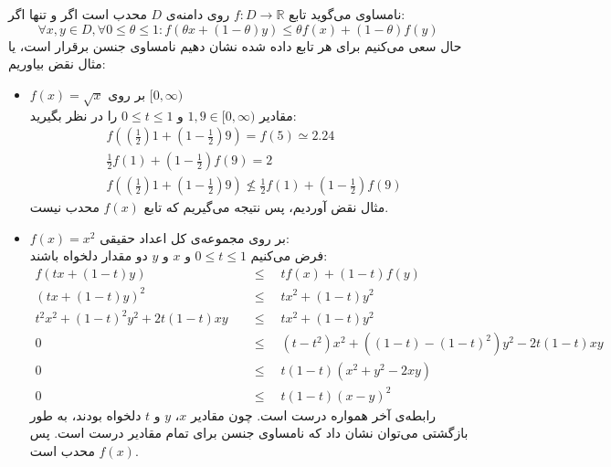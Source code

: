 \question{}

\begin{ابجد}
\item نامساوی  می‌گوید تابع $f: D \rightarrow \mathbb{R}$ روی دامنه‌ی $D$ محدب است اگر و تنها اگر:
\begin{equation*}
    \forall x, y \in D, \forall 0 \leq \theta \leq 1: f(\theta x + (1 - \theta)y) \leq \theta f(x) + (1 - \theta) f(y)
\end{equation*}
حال سعی می‌کنیم برای هر تابع داده شده نشان دهیم نامساوی جنسن برقرار است، یا مثال نقض بیاوریم:

\begin{itemize}
    \item $f(x) = \sqrt{x}$ بر روی $[0,\infty)$ \\ مقادیر $1, 9 \in [0,\infty)$ و $0 \leq t \leq 1$ را در نظر بگیرید:
          \begin{align*}
               & f((\frac{1}{2})1 + (1 - \frac{1}{2})9) = f(5) \simeq 2.24                            \\
               & \frac{1}{2}f(1) + (1 - \frac{1}{2})f(9) = 2                                          \\
               & f((\frac{1}{2})1 + (1 - \frac{1}{2})9) \nleq \frac{1}{2}f(1) + (1 - \frac{1}{2})f(9)
          \end{align*}
          مثال نقض آوردیم، پس نتیجه می‌گیریم که تابع $f(x)$ محدب نیست.

    \item $f(x) = x^2$ بر روی مجموعه‌ی کل اعداد حقیقی: \\ فرض می‌کنیم $0 \leq t \leq 1$ و $x$ و $y$ دو مقدار دلخواه باشند:
          \begin{align*}
              f(tx + (1 - t)y) \quad                & \leq \quad tf(x) + (1 - t)f(y)                               \\
              (tx + (1 - t)y)^2 \quad               & \leq \quad tx^2 + (1 - t)y^2                                 \\
              t^2x^2 + (1-t)^2y^2 + 2t(1-t)xy \quad & \leq \quad tx^2 + (1 - t)y^2                                 \\
              0 \quad                               & \leq \quad (t - t^2)x^2 + ((1-t) - (1-t)^2)y^2 - 2t(1 - t)xy \\
              0 \quad                               & \leq \quad t(1-t)(x^2 + y^2 - 2xy)                           \\
              0 \quad                               & \leq \quad t(1-t)(x - y)^2
          \end{align*}
          رابطه‌ی آخر همواره درست است. چون مقادیر $x$، $y$ و $t$ دلخواه بودند، به طور بازگشتی می‌توان نشان داد که نامساوی جنسن برای تمام مقادیر درست است. پس $f(x)$ محدب است.


\end{itemize}
\end{ابجد}
